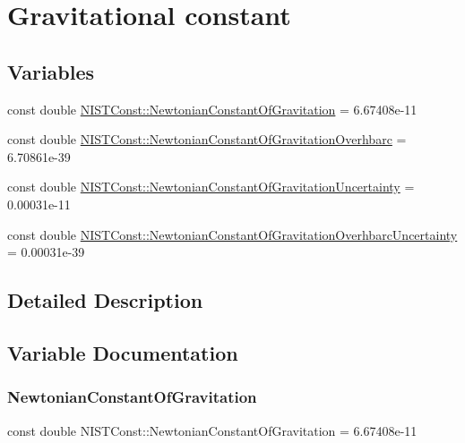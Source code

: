 \hypertarget{group___gravitational_constant}{}\section{Gravitational constant}
\label{group___gravitational_constant}
\subsection*{Variables}
\begin{DoxyCompactItemize}
\item 
const double \hyperlink{group___gravitational_constant_gaba6371307f4cebde50b3c61a07c724c5}{N\+I\+S\+T\+Const\+::\+Newtonian\+Constant\+Of\+Gravitation} = 6.\+67408e-\/11
\item 
const double \hyperlink{group___gravitational_constant_gad7c8d8ef09f60e8f3f36f86f98df0472}{N\+I\+S\+T\+Const\+::\+Newtonian\+Constant\+Of\+Gravitation\+Overhbarc} = 6.\+70861e-\/39
\item 
const double \hyperlink{group___gravitational_constant_ga8fc40fce6dc42f5e84a3c908553e6586}{N\+I\+S\+T\+Const\+::\+Newtonian\+Constant\+Of\+Gravitation\+Uncertainty} = 0.\+00031e-\/11
\item 
const double \hyperlink{group___gravitational_constant_gaf10cbbd8ad1ece4ec01e35fe3d86854f}{N\+I\+S\+T\+Const\+::\+Newtonian\+Constant\+Of\+Gravitation\+Overhbarc\+Uncertainty} = 0.\+00031e-\/39
\end{DoxyCompactItemize}


\subsection{Detailed Description}


\subsection{Variable Documentation}
\mbox{\label{group___gravitational_constant_gaba6371307f4cebde50b3c61a07c724c5}} 
\subsubsection{\texorpdfstring{Newtonian\+Constant\+Of\+Gravitation}{NewtonianConstantOfGravitation}}
{\footnotesize\ttfamily const double N\+I\+S\+T\+Const\+::\+Newtonian\+Constant\+Of\+Gravitation = 6.\+67408e-\/11}

